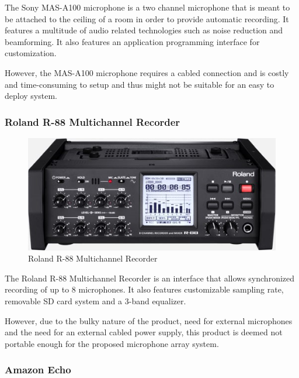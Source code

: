 \documentclass[hidelinks,12pt]{report} %
\begin{document}
The Sony MAS-A100 microphone is a two channel microphone that is meant to be attached to the ceiling of a room in order to provide automatic recording. It features a multitude of audio related technologies such as noise reduction and beamforming. It also features an application programming interface for customization.

However, the MAS-A100 microphone requires a cabled connection and is costly and time-consuming to setup and thus might not be suitable for an easy to deploy system\cite{19}.

\subsubsection{Roland R-88 Multichannel Recorder}

\begin{figure}[h]
\centering
\includegraphics[scale = 1.0]{fig2.4} 
\caption{Roland R-88 Multichannel Recorder}
\label{fig}
\end{figure}

The Roland R-88 Multichannel Recorder is an interface that allows synchronized recording of up to 8 microphones. It also features customizable sampling rate, removable SD card system and a 3-band equalizer.

However, due to the bulky nature of the product, need for external microphones and the need for an external cabled power supply, this product is deemed not portable enough for the proposed microphone array system\cite{20}. 

\subsubsection{Amazon Echo}
\end{document}
